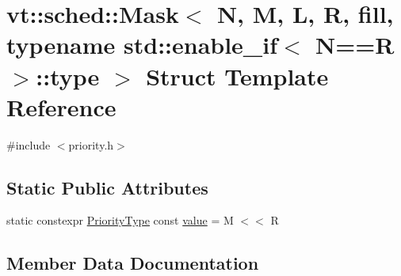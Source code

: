 \hypertarget{structvt_1_1sched_1_1_mask_3_01_n_00_01_m_00_01_l_00_01_r_00_01fill_00_01typename_01std_1_1enablb425bc242171a4de39f2db76b78da09f}{}\section{vt\+:\+:sched\+:\+:Mask$<$ N, M, L, R, fill, typename std\+:\+:enable\+\_\+if$<$ N==R $>$\+:\+:type $>$ Struct Template Reference}
\label{structvt_1_1sched_1_1_mask_3_01_n_00_01_m_00_01_l_00_01_r_00_01fill_00_01typename_01std_1_1enablb425bc242171a4de39f2db76b78da09f}


{\ttfamily \#include $<$priority.\+h$>$}

\subsection*{Static Public Attributes}
\begin{DoxyCompactItemize}
\item 
static constexpr \hyperlink{namespacevt_a86bff9f556eb761b27fc8600d006ac04}{Priority\+Type} const \hyperlink{structvt_1_1sched_1_1_mask_3_01_n_00_01_m_00_01_l_00_01_r_00_01fill_00_01typename_01std_1_1enablb425bc242171a4de39f2db76b78da09f_a26ca5fb3bba5f44f4a1852c1ec0f2099}{value} = M $<$$<$ R
\end{DoxyCompactItemize}


\subsection{Member Data Documentation}
\mbox{\label{structvt_1_1sched_1_1_mask_3_01_n_00_01_m_00_01_l_00_01_r_00_01fill_00_01typename_01std_1_1enablb425bc242171a4de39f2db76b78da09f_a26ca5fb3bba5f44f4a1852c1ec0f2099}} 
